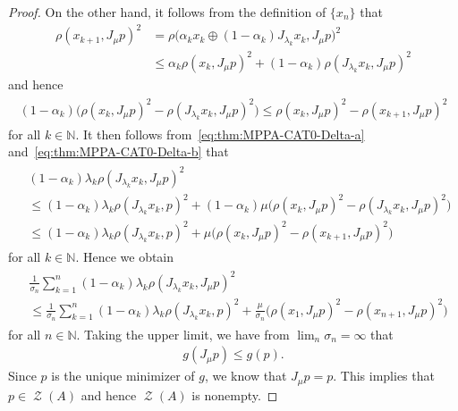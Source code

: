 \documentclass[draft]{amsart}
\numberwithin{equation}{section}
\def\N{\mathbb N}
\DeclareMathOperator{\Zer}{\mathcal{Z}}
\theoremstyle{plain}
\theoremstyle{definition}
\theoremstyle{remark}
\begin{document}
\begin{proof}
 On the other hand, it follows from the definition of $\{x_n\}$ that 
 \begin{align*}
  \rho(x_{k+1}, J_{\mu}p)^2 
  &= \rho \bigl(\alpha_k x_k \oplus (1-\alpha_k)J_{\lambda_k}x_k, J_{\mu}p\bigr)^2 \\
  &\leq 
  \alpha_k\rho(x_{k}, J_{\mu}p)^2 + (1-\alpha_k)\rho(J_{\lambda_k}x_k, J_{\mu}p)^2
 \end{align*}
 and hence 
 \begin{align}
  \begin{split}\label{eq:thm:MPPA-CAT0-Delta-b}
   (1-\alpha_k)\bigl(\rho(x_k, J_{\mu}p)^2 - \rho(J_{\lambda_k}x_k, J_{\mu}p)^2 \bigr)
   \leq \rho(x_{k}, J_{\mu}p)^2 - \rho(x_{k+1}, J_{\mu}p)^2 
  \end{split}
 \end{align}
 for all $k\in \N$. It then follows from~\eqref{eq:thm:MPPA-CAT0-Delta-a} 
 and~\eqref{eq:thm:MPPA-CAT0-Delta-b} that 
 \begin{align*}
  \begin{split}
   &(1-\alpha_k)\lambda_k \rho(J_{\lambda_k}x_k, J_{\mu}p)^2 \\
   &\leq (1-\alpha_k) \lambda_k \rho(J_{\lambda_k}x_k, p)^2 
  + (1-\alpha_k) \mu \bigl(
     \rho(x_k, J_{\mu}p)^2 - \rho (J_{\lambda_k}x_k, J_{\mu}p)^2 
   \bigr) \\
   &\leq 
   (1-\alpha_k)\lambda_k \rho(J_{\lambda_k}x_k, p)^2 
  + \mu \bigl(
     \rho(x_k, J_{\mu}p)^2 - \rho (x_{k+1}, J_{\mu}p)^2 
   \bigr)
  \end{split}
 \end{align*}
 for all $k\in \N$. Hence we obtain 
 \begin{align*}
  \begin{split}
   &\frac{1}{\sigma_n}\sum_{k=1}^{n}(1-\alpha_k)\lambda_k \rho(J_{\lambda_k}x_k, J_{\mu}p)^2 \\
   &\leq 
   \frac{1}{\sigma_n}\sum_{k=1}^{n}(1-\alpha_k)\lambda_k \rho(J_{\lambda_k}x_k, p)^2 
   + \frac{\mu}{\sigma_n} \bigl(
     \rho(x_1, J_{\mu}p)^2 - \rho (x_{n+1}, J_{\mu}p)^2 
   \bigr)
  \end{split}
 \end{align*}
 for all $n\in \N$. Taking the upper limit, we have from $\lim_{n}\sigma_n=\infty$ that 
 \begin{align*}
  g(J_{\mu}p) \leq g(p). 
 \end{align*}
 Since $p$ is the unique minimizer of $g$, we know that $J_{\mu}p = p$. 
 This implies that $p\in \Zer (A)$ and hence $\Zer (A)$ is nonempty. 


\end{proof}
\end{document}
